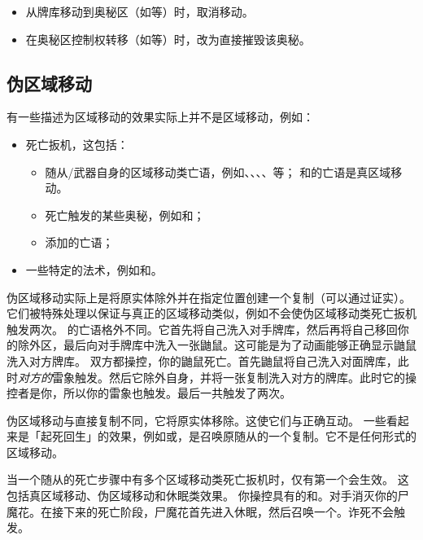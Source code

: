 \begin{itemize}
    \item 从牌库移动到奥秘区（如等）时，取消移动。
    \item 在奥秘区控制权转移（如等）时，改为直接摧毁该奥秘。
\end{itemize}

\subsection{伪区域移动}

有一些描述为区域移动的效果实际上并不是区域移动，例如：

\begin{itemize}
    \item 死亡扳机，这包括：
    \begin{itemize}
        \item 随从/武器自身的区域移动类亡语，例如、、、、等；
            \exception {}和的亡语是真区域移动。
        \item 死亡触发的某些奥秘，例如和；
        \item {}添加的亡语；
    \end{itemize}
    \item 一些特定的法术，例如和。
\end{itemize}

伪区域移动实际上是将原实体除外并在指定位置创建一个复制（可以通过证实）。它们被特殊处理以保证与真正的区域移动类似，例如不会使伪区域移动类死亡扳机触发两次。
\exception {}的亡语格外不同。它首先将自己洗入对手牌库，然后再将自己移回你的除外区，最后向对手牌库中洗入一张鼬鼠。这可能是为了动画能够正确显示鼬鼠洗入对方牌库。
\example 双方都操控，你的鼬鼠死亡。首先鼬鼠将自己洗入对面牌库，此时\emph{对方的}雷象触发。然后它除外自身，并将一张复制洗入对方的牌库。此时它的操控者是你，所以你的雷象也触发。最后一共触发了两次。

\notice 伪区域移动与直接复制不同，它将原实体移除。这使它们与正确互动。
\notice 一些看起来是「起死回生」的效果，例如或，是召唤原随从的一个复制。它不是任何形式的区域移动。

当一个随从的死亡步骤中有多个区域移动类死亡扳机时，仅有第一个会生效。
\notice 这包括真区域移动、伪区域移动和休眠类效果。
\example 你操控具有的和。对手消灭你的尸魔花。在接下来的死亡阶段，尸魔花首先进入休眠，然后召唤一个。诈死不会触发。

